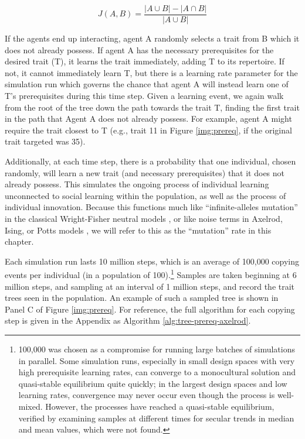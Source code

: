 \documentclass[graybox,natbib]{svmult}
\begin{document}
\begin{equation}J(A,B) = \frac{|A \cup B| - |A \cap B|}{|A \cup B|}\end{equation}

If the agents end up interacting, agent A randomly selects a trait from
B which it does not already possess. If agent A has the necessary
prerequisites for the desired trait (T), it learns the trait
immediately, adding T to its repertoire. If not, it cannot immediately
learn T, but there is a learning rate parameter for the simulation run
which governs the chance that agent A will instead learn one of T's
prerequisites during this time step. Given a learning event, we again
walk from the root of the tree down the path towards the trait T,
finding the first trait in the path that Agent A does not already
possess. For example, agent A might require the trait closest to T
(e.g., trait 11 in Figure \ref{img:prereq}, if the original trait
targeted was 35).

Additionally, at each time step, there is a probability that one
individual, chosen randomly, will learn a new trait (and necessary
prerequisites) that it does not already possess. This simulates the
ongoing process of individual learning unconnected to social learning
within the population, as well as the process of individual innovation.
Because this functions much like ``infinite-alleles mutation'' in the
classical Wright-Fisher neutral models \citep{Ewens2004}, or like noise
terms in Axelrod, Ising, or Potts models
\citep{castellano2009statistical}, we will refer to this as the
``mutation'' rate in this chapter.

Each simulation run lasts 10 million steps, which is an average of
100,000 copying events per individual (in a population of
100).\footnote{100,000 was chosen as a compromise for running large
  batches of simulations in parallel. Some simulation runs, especially
  in small design spaces with very high prerequisite learning rates, can
  converge to a monocultural solution and quasi-stable equilibrium quite
  quickly; in the largest design spaces and low learning rates,
  convergence may never occur even though the process is well-mixed.
  However, the processes have reached a quasi-stable equilibrium,
  verified by examining samples at different times for secular trends in
  median and mean values, which were not found.} Samples are taken
beginning at 6 million steps, and sampling at an interval of 1 million
steps, and record the trait trees seen in the population. An example of
such a sampled tree is shown in Panel C of Figure \ref{img:prereq}. For
reference, the full algorithm for each copying step is given in the
Appendix as Algorithm \ref{alg:tree-prereq-axelrod}.
\end{document}
